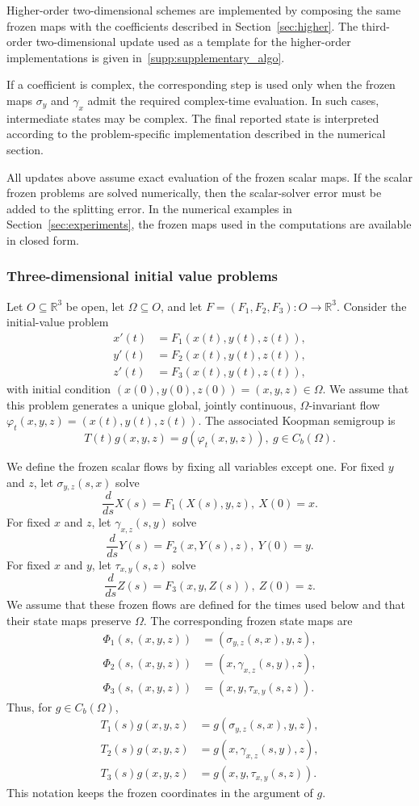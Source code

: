 \documentclass[preprint,1p,times,nopreprintline]{elsarticle}
\begin{document}
Higher-order two-dimensional schemes are implemented by composing the same frozen maps with the coefficients described in Section~\ref{sec:higher}. The third-order two-dimensional update used as a template for the higher-order implementations is given in~\ref{supp:supplementary_algo}.

If a coefficient is complex, the corresponding step is used only when the frozen maps $\sigma_y$ and $\gamma_x$ admit the required complex-time evaluation. In such cases, intermediate states may be complex. The final reported state is interpreted according to the problem-specific implementation described in the numerical section.

All updates above assume exact evaluation of the frozen scalar maps. If the scalar frozen problems are solved numerically, then the scalar-solver error must be added to the splitting error. In the numerical examples in Section~\ref{sec:experiments}, the frozen maps used in the computations are available in closed form.

\subsubsection{Three-dimensional initial value problems}

Let $O\subseteq\mathbb{R}^3$ be open, let $\Omega\subseteq O$, and let $F=(F_1,F_2,F_3):O\to\mathbb{R}^3$. Consider the initial-value problem
\begin{align*}
x'(t)&=F_1(x(t),y(t),z(t)),\\
y'(t)&=F_2(x(t),y(t),z(t)),\\
z'(t)&=F_3(x(t),y(t),z(t)),
\end{align*}
with initial condition $(x(0),y(0),z(0))=(x,y,z)\in\Omega$. We assume that this problem generates a unique global, jointly continuous, $\Omega$-invariant flow $\varphi_t(x,y,z)=(x(t),y(t),z(t))$. The associated Koopman semigroup is
\[
T(t)g(x,y,z)=g(\varphi_t(x,y,z)),
~
g\in C_b(\Omega).
\]

We define the frozen scalar flows by fixing all variables except one. For fixed $y$ and $z$, let $\sigma_{y,z}(s,x)$ solve
\[
\frac{d}{ds}X(s)=F_1(X(s),y,z),
~
X(0)=x.
\]
For fixed $x$ and $z$, let $\gamma_{x,z}(s,y)$ solve
\[
\frac{d}{ds}Y(s)=F_2(x,Y(s),z),
~
Y(0)=y.
\]
For fixed $x$ and $y$, let $\tau_{x,y}(s,z)$ solve
\[
\frac{d}{ds}Z(s)=F_3(x,y,Z(s)),
~
Z(0)=z.
\]
We assume that these frozen flows are defined for the times used below and that their state maps preserve $\Omega$. The corresponding frozen state maps are
\begin{align*}
\Phi_1(s,(x,y,z))&=(\sigma_{y,z}(s,x),y,z),\\
\Phi_2(s,(x,y,z))&=(x,\gamma_{x,z}(s,y),z),\\
\Phi_3(s,(x,y,z))&=(x,y,\tau_{x,y}(s,z)).
\end{align*}
Thus, for $g\in C_b(\Omega)$,
\begin{align*}
T_1(s)g(x,y,z)
&=
g(\sigma_{y,z}(s,x),y,z),\\
T_2(s)g(x,y,z)
&=
g(x,\gamma_{x,z}(s,y),z),\\
T_3(s)g(x,y,z)
&=
g(x,y,\tau_{x,y}(s,z)).
\end{align*}
This notation keeps the frozen coordinates in the argument of $g$.
\end{document}

